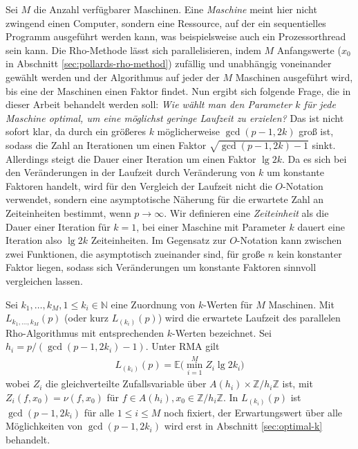 \documentclass[a4paper, 11pt, ngerman]{article}
\newcommand{\E}{\mathbb{E}}
\newcommand{\N}{\mathbb{N}}
\newcommand{\Z}{\mathbb{Z}}
\theoremstyle{definition}
\theoremstyle{plain}
\theoremstyle{remark}
\begin{document}
Sei $M$ die Anzahl verfügbarer Maschinen. Eine \emph{Maschine} meint hier nicht zwingend einen Computer, sondern eine Ressource, auf der ein sequentielles Programm ausgeführt werden kann, was beispielsweise auch ein Prozessorthread sein kann. Die Rho-Methode lässt sich parallelisieren, indem $M$ Anfangswerte ($x_0$ in Abschnitt \ref{sec:pollards-rho-method}) zufällig und unabhängig voneinander gewählt werden und der Algorithmus auf jeder der $M$ Maschinen ausgeführt wird, bis eine der Maschinen einen Faktor findet. Nun ergibt sich folgende Frage, die in dieser Arbeit behandelt werden soll: \emph{Wie wählt man den Parameter $k$ für jede Maschine optimal, um eine möglichst geringe Laufzeit zu erzielen?} Das ist nicht sofort klar, da durch ein größeres $k$ möglicherweise $\gcd(p - 1, 2k)$ groß ist, sodass die Zahl an Iterationen um einen Faktor $\sqrt{\gcd(p - 1, 2k) -1}$ sinkt. Allerdings steigt die Dauer einer Iteration um einen Faktor $\lg 2k$. Da es sich bei den Veränderungen in der Laufzeit durch Veränderung von $k$ um konstante Faktoren handelt, wird für den Vergleich der Laufzeit nicht die $O$-Notation verwendet, sondern eine asymptotische Näherung für die erwartete Zahl an Zeiteinheiten bestimmt, wenn $p \to \infty$. Wir definieren eine \emph{Zeiteinheit} als die Dauer einer Iteration für $k = 1$, bei einer Maschine mit Parameter $k$ dauert eine Iteration also $\lg 2k$ Zeiteinheiten. Im Gegensatz zur $O$-Notation kann zwischen zwei Funktionen, die asymptotisch zueinander sind, für große $n$ kein konstanter Faktor liegen, sodass sich Veränderungen um konstante Faktoren sinnvoll vergleichen lassen.

Sei $k_1, \dots, k_M, 1 \le k_i \in \N$ eine Zuordnung von $k$-Werten für $M$ Maschinen. Mit $L_{k_1, \dots, k_M}(p)$ (oder kurz $L_{(k_i)}(p)$) wird die erwartete Laufzeit des parallelen Rho-Algorithmus mit entsprechenden $k$-Werten bezeichnet. Sei $h_i = p/(\gcd(p - 1, 2k_i) - 1)$. Unter RMA gilt
\begin{align}
    L_{(k_i)}(p) = \E \bigg ( \min_{i = 1}^M Z_i \lg 2k_i \bigg )
    \label{eq:lki-definition}
\end{align}
wobei $Z_i$ die gleichverteilte Zufallsvariable über $A(h_i) \times \Z/h_i\Z$ ist, mit $Z_i(f, x_0) = \nu(f, x_0)$ für $f \in A(h_i), x_0 \in \Z/h_i\Z$. In $L_{(k_i)}(p)$ ist $\gcd(p - 1, 2k_i)$ für alle $1 \le i \le M$ noch fixiert, der Erwartungswert über alle Möglichkeiten von $\gcd(p - 1, 2k_i)$ wird erst in Abschnitt \ref{sec:optimal-k} behandelt.
\end{document}
